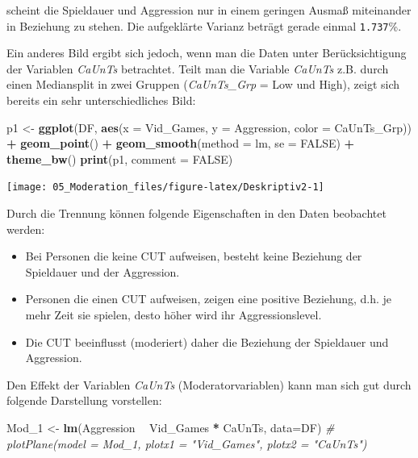 \documentclass[]{article}
\newenvironment{Shaded}{\begin{snugshade}}{\end{snugshade}}
\newcommand{\CommentTok}[1]{\textcolor[rgb]{0.56,0.35,0.01}{\textit{#1}}}
\newcommand{\DataTypeTok}[1]{\textcolor[rgb]{0.13,0.29,0.53}{#1}}
\newcommand{\DecValTok}[1]{\textcolor[rgb]{0.00,0.00,0.81}{#1}}
\newcommand{\KeywordTok}[1]{\textcolor[rgb]{0.13,0.29,0.53}{\textbf{#1}}}
\newcommand{\NormalTok}[1]{#1}
\newcommand{\OperatorTok}[1]{\textcolor[rgb]{0.81,0.36,0.00}{\textbf{#1}}}
\newcommand{\OtherTok}[1]{\textcolor[rgb]{0.56,0.35,0.01}{#1}}
\newcommand{\StringTok}[1]{\textcolor[rgb]{0.31,0.60,0.02}{#1}}
\providecommand{\tightlist}{%
  \setlength{\itemsep}{0pt}\setlength{\parskip}{0pt}}
\begin{document}
scheint die Spieldauer und Aggression nur in einem geringen Ausmaß miteinander in Beziehung zu stehen. Die aufgeklärte Varianz beträgt gerade einmal \texttt{1.737}\%.

Ein anderes Bild ergibt sich jedoch, wenn man die Daten unter Berücksichtigung der Variablen \emph{CaUnTs} betrachtet. Teilt man die Variable \emph{CaUnTs} z.B. durch einen Mediansplit in zwei Gruppen (\emph{CaUnTs\_Grp} = Low und High), zeigt sich bereits ein sehr unterschiedliches Bild:

\begin{Shaded}
\begin{Highlighting}[]
\NormalTok{    p1 <-}\StringTok{ }\KeywordTok{ggplot}\NormalTok{(DF, }\KeywordTok{aes}\NormalTok{(}\DataTypeTok{x =}\NormalTok{ Vid_Games, }\DataTypeTok{y =}\NormalTok{ Aggression, }\DataTypeTok{color =}\NormalTok{ CaUnTs_Grp)) }\OperatorTok{+}\StringTok{ }
\StringTok{        }\KeywordTok{geom_point}\NormalTok{() }\OperatorTok{+}\StringTok{ }
\StringTok{        }\KeywordTok{geom_smooth}\NormalTok{(}\DataTypeTok{method =}\NormalTok{ lm, }\DataTypeTok{se =} \OtherTok{FALSE}\NormalTok{) }\OperatorTok{+}
\StringTok{        }\KeywordTok{theme_bw}\NormalTok{()}
    \KeywordTok{print}\NormalTok{(p1, }\DataTypeTok{comment =} \OtherTok{FALSE}\NormalTok{)}
\end{Highlighting}
\end{Shaded}

\begin{center}\texttt{[image: 05\_Moderation\_files/figure-latex/Deskriptiv2-1]} \end{center}

Durch die Trennung können folgende Eigenschaften in den Daten beobachtet werden:

\begin{itemize}
\tightlist
\item
  Bei Personen die keine CUT aufweisen, besteht keine Beziehung der Spieldauer und der Aggression.
\item
  Personen die einen CUT aufweisen, zeigen eine positive Beziehung, d.h. je mehr Zeit sie spielen, desto
  höher wird ihr Aggressionslevel.
\item
  Die CUT beeinflusst (moderiert) daher die Beziehung der Spieldauer und Aggression.
\end{itemize}

Den Effekt der Variablen \emph{CaUnTs} (Moderatorvariablen) kann man sich gut durch folgende Darstellung vorstellen:

\begin{Shaded}
\begin{Highlighting}[]
\NormalTok{    Mod_}\DecValTok{1}\NormalTok{ <-}\StringTok{ }\KeywordTok{lm}\NormalTok{(Aggression }\OperatorTok{~}\StringTok{ }\NormalTok{Vid_Games }\OperatorTok{*}\StringTok{ }\NormalTok{CaUnTs, }\DataTypeTok{data=}\NormalTok{DF)}
    \CommentTok{# plotPlane(model = Mod_1, plotx1 = "Vid_Games", plotx2 = "CaUnTs")}
\end{Highlighting}
\end{Shaded}
\end{document}
